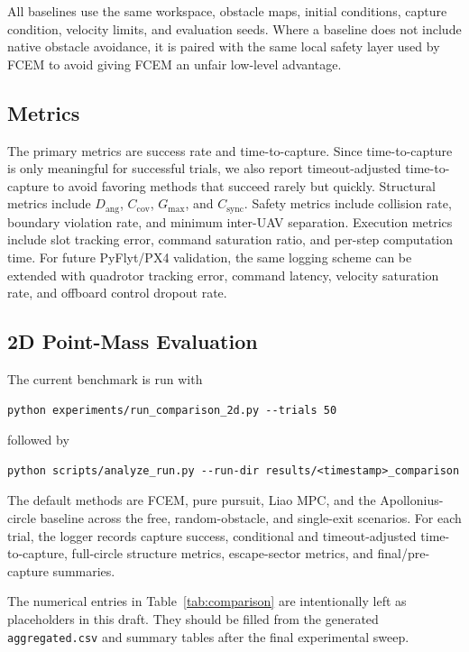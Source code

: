 \documentclass[journal]{IEEEtran}
\newcommand{\Dang}{D_{\mathrm{ang}}}
\newcommand{\Ccov}{C_{\mathrm{cov}}}
\newcommand{\Gmax}{G_{\max}}
\newcommand{\Csync}{C_{\mathrm{sync}}}
\begin{document}
All baselines use the same workspace, obstacle maps, initial conditions, capture condition, velocity limits, and evaluation seeds.
Where a baseline does not include native obstacle avoidance, it is paired with the same local safety layer used by FCEM to avoid giving FCEM an unfair low-level advantage.

\subsection{Metrics}
\label{sec:metrics}

The primary metrics are success rate and time-to-capture.
Since time-to-capture is only meaningful for successful trials, we also report timeout-adjusted time-to-capture to avoid favoring methods that succeed rarely but quickly.
Structural metrics include $\Dang$, $\Ccov$, $\Gmax$, and $\Csync$.
Safety metrics include collision rate, boundary violation rate, and minimum inter-UAV separation.
Execution metrics include slot tracking error, command saturation ratio, and per-step computation time.
For future PyFlyt/PX4 validation, the same logging scheme can be extended with quadrotor tracking error, command latency, velocity saturation rate, and offboard control dropout rate.

\subsection{2D Point-Mass Evaluation}
\label{sec:results_2d}

The current benchmark is run with
\begin{verbatim}
python experiments/run_comparison_2d.py --trials 50
\end{verbatim}
followed by
\begin{verbatim}
python scripts/analyze_run.py --run-dir results/<timestamp>_comparison
\end{verbatim}
The default methods are FCEM, pure pursuit, Liao MPC, and the Apollonius-circle baseline across the free, random-obstacle, and single-exit scenarios.
For each trial, the logger records capture success, conditional and timeout-adjusted time-to-capture, full-circle structure metrics, escape-sector metrics, and final/pre-capture summaries.

The numerical entries in Table~\ref{tab:comparison} are intentionally left as placeholders in this draft.
They should be filled from the generated \texttt{aggregated.csv} and summary tables after the final experimental sweep.
\end{document}
